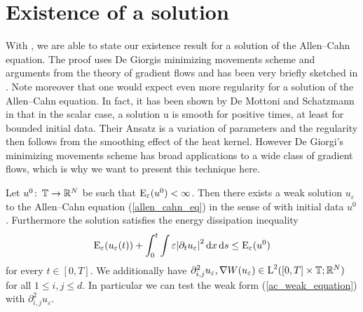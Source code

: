 \section{Existence of a solution}

With , we are able to state our existence result for a
solution of the Allen--Cahn equation. The proof uses De Giorgis minimizing 
movements scheme and arguments from the theory of gradient flows and has been 
very 
briefly sketched in 
\cite{convergence_of_allen_cahn_equation_to_multiphase_mean_curvature_flow}. 
Note moreover that one would expect even more regularity for a solution 
of the Allen--Cahn equation. In fact, it has been shown by De Mottoni and 
Schatzmann in 
\cite{de_mottoni_schatzmann_geometrical_evolution_of_developed_interfaces} that 
in the scalar case, a solution u is 
smooth for positive times, at least for bounded initial data. 
Their Ansatz is a 
variation of parameters and the 
regularity then follows from the smoothing effect of the heat kernel. However 
De 
Giorgi's minimizing movements scheme has broad applications to a wide class of 
gradient flows, which is why we want to present this technique here.

\begin{theorem}
	\label{existence_of_ac_solution}
	Let $ u^{ 0 } \colon \operatorname{\mathbb{T}} \to \mathbb{ R }^{ N } $ be such that 
	$ \operatorname{E}_{ \varepsilon } ( u^{ 0 } ) < \infty $.
	Then there exists a weak solution $ u_{ \varepsilon} $ to the Allen--Cahn 
	equation (\ref{allen_cahn_eq}) in the sense of  with 
	initial data $ u^{ 0 } $.
	Furthermore the solution satisfies the energy dissipation inequality
	\begin{equation}
		\label{energy_dissipation_sharp}
		\operatorname{E}_{ \varepsilon } ( u_{ \varepsilon } ( t ) )
		+
		\int_{ 0 }^{ t }
		\int
		\varepsilon \abs{ \partial_{ t } u_{ \varepsilon } }^{ 2 }
		\dd{ x }
		\dd{ s }
		\leq
		\operatorname{E}_{ \varepsilon } ( u^{ 0 } )
	\end{equation}
	for every $ t \in [ 0 , T ] $. We additionally have
	$
	\partial_{ i , j }^{ 2 } u_{ \varepsilon }, \nabla W ( u_{ \varepsilon } ) \in \operatorname{L}^{ 2 } ( [0, T] \times \operatorname{\mathbb{T}} ; \mathbb{ R }^{ N } ) 
	$
	for all $ 1 \leq i, j \leq d $. In particular we can test the weak form (\ref{ac_weak_equation}) with $ \partial_{ i , j }^{ 2 } u_{ \varepsilon } $.
\end{theorem}


